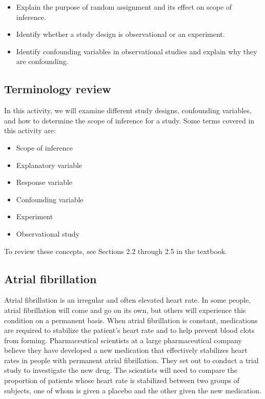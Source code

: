 \documentclass[
]{report}
\begin{document}
\begin{itemize}
\item
  Explain the purpose of random assignment and its effect on scope of inference.
\item
  Identify whether a study design is observational or an experiment.
\item
  Identify confounding variables in observational studies and explain why they are confounding.
\end{itemize}

\subsection{Terminology review}\label{terminology-review-14}

In this activity, we will examine different study designs, confounding variables, and how to determine the scope of inference for a study. Some terms covered in this activity are:

\begin{itemize}
\item
  Scope of inference
\item
  Explanatory variable
\item
  Response variable
\item
  Confounding variable
\item
  Experiment
\item
  Observational study
\end{itemize}

To review these concepts, see Sections 2.2 through 2.5 in the textbook.

\subsection{Atrial fibrillation}\label{atrial-fibrillation}

Atrial fibrillation is an irregular and often elevated heart rate. In some people, atrial fibrillation will come and go on its own, but others will experience this condition on a permanent basis. When atrial fibrillation is constant, medications are required to stabilize the patient's heart rate and to help prevent blood clots from forming. Pharmaceutical scientists at a large pharmaceutical company believe they have developed a new medication that effectively stabilizes heart rates in people with permanent atrial fibrillation. They set out to conduct a trial study to investigate the new drug. The scientists will need to compare the proportion of patients whose heart rate is stabilized between two groups of subjects, one of whom is given a placebo and the other given the new medication.
\end{document}
